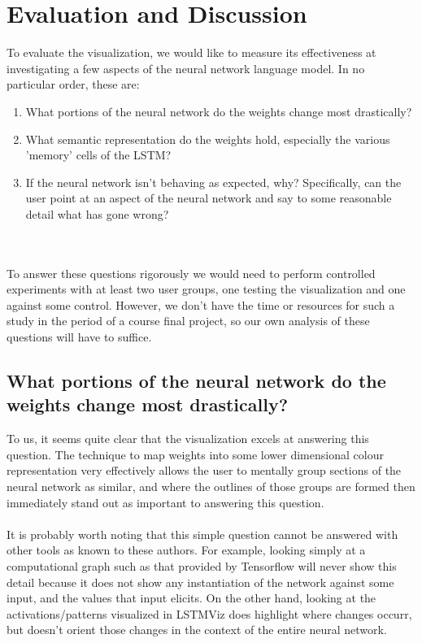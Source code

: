 \documentclass[journal]{vgtc}                %
\begin{document}
\section{Evaluation and Discussion}
To evaluate the visualization, we would like to measure its effectiveness at investigating a few aspects of the neural network language model.
In no particular order, these are:
\begin{enumerate}
    \item What portions of the neural network do the weights change most drastically?
    \item What semantic representation do the weights hold, especially the various 'memory' cells of the LSTM?
    \item If the neural network isn't behaving as expected, why?  Specifically, can the user point at an aspect of the neural network and say to some reasonable detail what has gone wrong?
\end{enumerate}
\\
\\
To answer these questions rigorously we would need to perform controlled experiments with at least two user groups, one testing the visualization and one against some control.
However, we don't have the time or resources for such a study in the period of a course final project, so our own analysis of these questions will have to suffice.

\subsection{What portions of the neural network do the weights change most drastically?}
To us, it seems quite clear that the visualization excels at answering this question.
The technique to map weights into some lower dimensional colour representation very effectively allows the user to mentally group sections of the neural network as similar, and where the outlines of those groups are formed then immediately stand out as important to answering this question.
\\
\\
It is probably worth noting that this simple question cannot be answered with other tools as known to these authors.
For example, looking simply at a computational graph such as that provided by Tensorflow will never show this detail because it does not show any instantiation of the network against some input, and the values that input elicits.
On the other hand, looking at the activations/patterns visualized in LSTMViz does highlight where changes occurr, but doesn't orient those changes in the context of the entire neural network.
\end{document}
